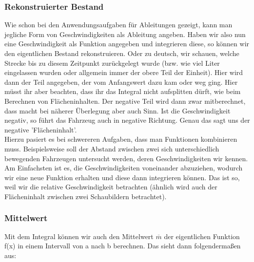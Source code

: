 	\subsubsection{Rekonstruierter Bestand}
		Wie schon bei den Anwendungsaufgaben für Ableitungen gezeigt, kann man
		jegliche Form von Geschwindigkeiten als Ableitung angeben. Haben wir also nun
		eine Geschwindigkeit als Funktion angegeben und integrieren diese, so können
		wir den eigentlichen Bestand rekonstruieren. Oder zu deutsch, wir schauen,
		welche Strecke bis zu diesem Zeitpunkt zurückgelegt wurde (bzw. wie viel Liter
		eingelassen wurden oder allgemein immer der obere Teil der Einheit). Hier wird
		dann der Teil angegeben, der vom Anfangswert dazu kam oder weg ging. Hier
		müsst ihr aber beachten, dass ihr das Integral nicht aufsplitten dürft, wie
		beim Berechnen von Flächeninhalten. Der negative Teil wird dann zwar
		mitberechnet, dass macht bei näherer Überlegung aber auch Sinn. Ist die
		Geschwindigkeit negativ, so führt das Fahrzeug auch in negative Richtung.
		Genau das sagt uns der negative 'Flächeninhalt'.\\
		Hierzu pasiert es bei schwereren Aufgaben, dass man Funktionen kombinieren
		muss. Beispielsweise soll der Abstand zwischen zwei sich unterschiedlich
		bewegenden Fahrzeugen untersucht werden, deren Geschwindigkeiten wir kennen.
		Am Einfachsten ist es, die Geschwindigkeiten voneinander abzuziehen, wodurch
		wir eine neue Funktion erhalten und diese dann integrieren können. Das ist so,
		weil wir die relative Geschwindigkeit betrachten (ähnlich wird auch der
		Flächeninhalt zwischen zwei Schaubildern betrachtet).

	\subsubsection{Mittelwert}
		Mit dem Integral können wir auch den Mittelwert \(\overline{m}\) der
		eigentlichen Funktion f(x) in einem Intervall von a nach b berechnen. Das
		sieht dann folgendermaßen aus:
		\\ \\
		\formel{\[\overline{m}=\frac{1}{b-a}\cdot \int\limits_a^b f(x)\]}

